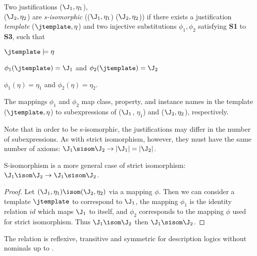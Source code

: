 \begin{defn}
\label{def:siso}
Two justifications ($\J_{1},\eta_{1}$), \\
($\J_{2},\eta_{2}$) are \emph{s-isomorphic} (($\J_{1},\eta_{1}$) \sisom ($\J_{2},\eta_{2}$)) if there exists a justification \emph{template} ($\jtemplate, \eta$) and two injective substitutions $\phi_{1}, \phi_{2}$ satisfying \textbf{S1} to \textbf{S3}, such that 
\begin{compactenum}
\item $\jtemplate \models \eta$
\item $\phi_{1}(\jtemplate)=\J_{1} $ and $\phi_{2}(\jtemplate) = \J_{2}$
\item $\phi_{1}(\eta)=\eta_{1}$ and $\phi_{2}(\eta)=\eta_{2}$.
\end{compactenum}
The mappings $\phi_{1}$ and $ \phi_{2}$ map class, property, and instance names in the template ($\jtemplate, \eta$) to subexpressions of ($\J_{1}$, $\eta_{1}$) and ($\J_{2}, \eta_{2}$), respectively.
\end{defn}
Note that in order to be s-isomorphic, the justifications may differ in the number of subexpressions. As with strict isomorphism, however, they must have the same number of axioms: $\J_{1} \sisom \J_{2} \rightarrow \left|\J_{1}\right| = \left|\J_{2}\right|$. 

\begin{prop}
\label{prop:siso}
S-isomorphism is a more general case of strict isomorphism: $\J_{1} \isom \J_{2} \rightarrow   \J_{1} \sisom \J_{2} $.
\end{prop}


\begin{proof}
Let $(\J_{1}, \eta_{1}) \isom (\J_{2}, \eta_{2})$ via a mapping $\phi$. Then we can consider a  template $\jtemplate$ to correspond to $\J_{1}$, the mapping $\phi_{1}$ is the identity relation $id$ which maps $\J_{1}$ to itself, and $\phi_{2}$ corresponds to the mapping $\phi$ used for strict isomorphism. Thus $\J_{1} \isom \J_{2}$ then $\J_{1} \sisom \J_{2}$.
\end{proof}


\begin{prop}
\label{prop:trans}
The relation \sisom is reflexive, transitive and symmetric for description logics without nominals up to .
\end{prop}

